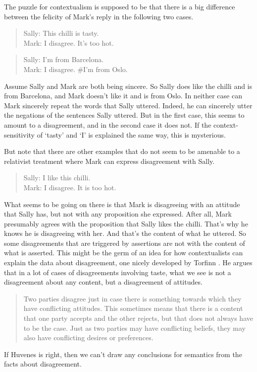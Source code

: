 The puzzle for contextualism is supposed to be that there is a big difference between the felicity of Mark's reply in the following two cases.

\begin{quote}

Sally: This chilli is tasty.\\
Mark: I disagree. It's too hot.
\end{quote}
\begin{quote}

Sally: I'm from Barcelona.\\
Mark: I disagree. \#I'm from Oslo.
\end{quote}
Assume Sally and Mark are both being sincere. So Sally does like the chilli and is from Barcelona, and Mark doesn't like it and is from Oslo. In neither case can Mark sincerely repeat the words that Sally uttered. Indeed, he can sincerely utter the negations of the sentences Sally uttered. But in the first case, this seems to amount to a disagreement, and in the second case it does not. If the context-sensitivity of `tasty' and `I' is explained the same way, this is mysterious.

But note that there are other examples that do not seem to be amenable to a relativist treatment where Mark can express disagreement with Sally.

\begin{quote}

Sally: I like this chilli.\\
Mark: I disagree. It is too hot.
\end{quote}
What seems to be going on there is that Mark is disagreeing with an attitude that Sally has, but not with any proposition she expressed. After all, Mark presumably agrees with the proposition that Sally likes the chilli. That's why he knows he is disagreeing with her. And that's the content of what he uttered. So some disagreements that are triggered by assertions are not with the content of what is asserted. This might be the germ of an idea for how contextualists can explain the data about disagreement, one nicely developed by Torfinn  \citet{Huvenes2012}. He argues that in a lot of cases of disagreements involving taste, what we see is not a disagreement about any content, but a disagreement of attitudes.

\begin{quote}

Two parties disagree just in case there is something towards which they have conflicting attitudes. This sometimes means that there is a content that one party accepts and the other rejects, but that does not always have to be the case. Just as two parties may have conflicting beliefs, they may also have conflicting desires or preferences. ~\citep[178]{Huvenes2012}
\end{quote}
If Huvenes is right, then we can't draw any conclusions for semantics from the facts about disagreement. 


